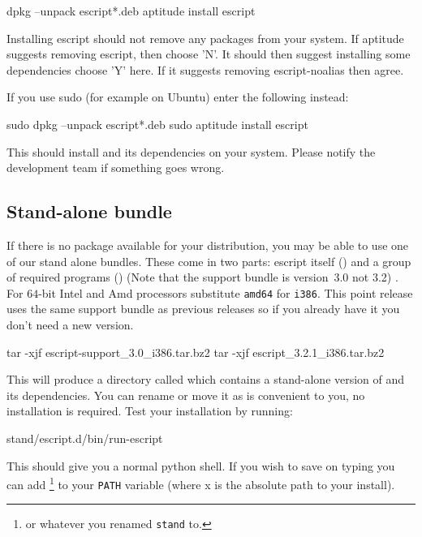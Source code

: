 \begin{shellCode}
dpkg --unpack escript*.deb
aptitude install escript
\end{shellCode}

Installing escript should not remove any packages from your system.
If aptitude suggests removing escript, then choose 'N'.
It should then suggest installing some dependencies choose 'Y' here.
If it suggests removing escript-noalias then agree.

If you use sudo (for example on Ubuntu) enter the following instead:
\begin{shellCode}
sudo dpkg --unpack escript*.deb
sudo aptitude install escript
\end{shellCode}

This should install \esfinley and its dependencies on your system.
Please notify the development team if something goes wrong.

\subsection{Stand-alone bundle}\label{sec:standalonelinux}

If there is no package available for your distribution, you may be able to use one of our stand alone bundles.
These come in two parts: escript itself () and a group of required programs () (Note that the support bundle is version~3.0 not 3.2) . For $64$-bit Intel and Amd processors substitute \texttt{amd64} for \texttt{i386}.
This point release uses the same support bundle as previous releases so if you already have it you don't need a new version.
\begin{shellCode}
tar -xjf escript-support_3.0_i386.tar.bz2
tar -xjf escript_3.2.1_i386.tar.bz2
\end{shellCode}
This will produce a directory called  which contains a stand-alone version of \esfinley and its dependencies.
You can rename or move it as is convenient to you, no installation is required.
Test your installation by running:
\begin{shellCode}
stand/escript.d/bin/run-escript
\end{shellCode}
This should give you a normal python shell.
If you wish to save on typing you can add \footnote{or whatever you renamed \texttt{stand} to.} to your \texttt{PATH} variable (where x is the absolute path to your install).

